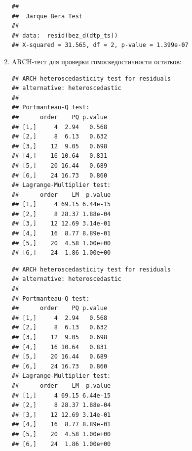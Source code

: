 \documentclass[14pt, a4paper]{extarticle}\usepackage[]{graphicx}\usepackage[]{color}
\makeatletter
\newenvironment{kframe}{%
 \def\at@end@of@kframe{}%
 \ifinner\ifhmode%
  \def\at@end@of@kframe{\end{minipage}}%
  \begin{minipage}{\columnwidth}%
 \fi\fi%
 \def\FrameCommand##1{\hskip\@totalleftmargin \hskip-\fboxsep
 \colorbox{shadecolor}{##1}\hskip-\fboxsep
     \hskip-\linewidth \hskip-\@totalleftmargin \hskip\columnwidth}%
 \MakeFramed {\advance\hsize-\width
   \@totalleftmargin\z@ \linewidth\hsize
   \@setminipage}}%
 {\par\unskip\endMakeFramed%
 \at@end@of@kframe}
\newenvironment{knitrout}{}{} %
\makeatother
\begin{document}
\begin{enumerate}
\begin{knitrout}
\color{fgcolor}\begin{kframe}
\begin{verbatim}
## 
## 	Jarque Bera Test
## 
## data:  resid(bez_d(dtp_ts))
## X-squared = 31.565, df = 2, p-value = 1.399e-07
\end{verbatim}
\end{kframe}
\end{knitrout}

\item ARCH-тест для проверки гомоскедостичности остатков:

\begin{knitrout}
\color{fgcolor}\begin{kframe}
\begin{verbatim}
## ARCH heteroscedasticity test for residuals 
## alternative: heteroscedastic 
## 
## Portmanteau-Q test: 
##      order    PQ p.value
## [1,]     4  2.94   0.568
## [2,]     8  6.13   0.632
## [3,]    12  9.05   0.698
## [4,]    16 10.64   0.831
## [5,]    20 16.44   0.689
## [6,]    24 16.73   0.860
## Lagrange-Multiplier test: 
##      order    LM  p.value
## [1,]     4 69.15 6.44e-15
## [2,]     8 28.37 1.88e-04
## [3,]    12 12.69 3.14e-01
## [4,]    16  8.77 8.89e-01
## [5,]    20  4.58 1.00e+00
## [6,]    24  1.86 1.00e+00
\end{verbatim}
\end{kframe}
\end{knitrout}

\begin{knitrout}
\color{fgcolor}\begin{kframe}
\begin{verbatim}
## ARCH heteroscedasticity test for residuals 
## alternative: heteroscedastic 
## 
## Portmanteau-Q test: 
##      order    PQ p.value
## [1,]     4  2.94   0.568
## [2,]     8  6.13   0.632
## [3,]    12  9.05   0.698
## [4,]    16 10.64   0.831
## [5,]    20 16.44   0.689
## [6,]    24 16.73   0.860
## Lagrange-Multiplier test: 
##      order    LM  p.value
## [1,]     4 69.15 6.44e-15
## [2,]     8 28.37 1.88e-04
## [3,]    12 12.69 3.14e-01
## [4,]    16  8.77 8.89e-01
## [5,]    20  4.58 1.00e+00
## [6,]    24  1.86 1.00e+00
\end{verbatim}
\end{kframe}
\end{knitrout}
\end{enumerate}
\end{document}
